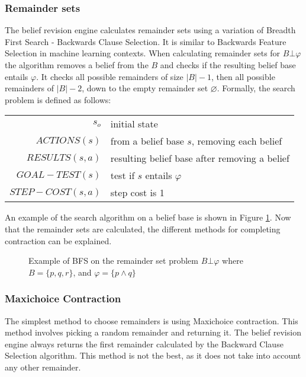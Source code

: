 \documentclass[a4paper,10pt]{article}
\newcommand{\norm}[1]{\lvert #1 \rvert}
\begin{document}
\subsubsection{Remainder sets}
\label{subsubsec:remainders}
The belief revision engine calculates remainder sets using a variation of Breadth First Search - Backwards Clause Selection. It is similar to Backwards Feature Selection in machine learning contexts. When calculating remainder sets for $B \bot\varphi$ the algorithm removes a belief from the $B$ and checks if the resulting belief base entails $\varphi$. It checks all possible remainders of size $\norm{B}-1$, then all possible remainders of $\norm{B}-2$, down to the empty remainder set $\varnothing$. Formally, the search problem is defined as follows:
\begin{table}[!htb]
\centering
\begin{tabular}{rl}
$s_o$ & initial state \\
$ACTIONS(s)$ & from a belief base $s$, removing each belief \\
$RESULTS(s, a)$ & resulting belief base after removing a belief \\
$GOAL-TEST(s)$ & test if $s$ entails $\varphi$ \\
$STEP-COST(s,a)$ & step cost is 1 \\
\end{tabular}
\end{table}

An example of the search algorithm on a belief base is shown in Figure \ref{fig:BFS}. Now that the remainder sets are calculated, the different methods for completing contraction can be explained.
\begin{figure}[!htb]
\centering
\caption{Example of BFS on the remainder set problem $B \bot\varphi$ where $B = \{p,q,r\}$, and $\varphi = \{p \wedge q\}$}
\label{fig:BFS}
\end{figure}

\subsubsection{Maxichoice Contraction}
\label{subsubsec:maxichoice}
The simplest method to choose remainders is using Maxichoice contraction. This method involves picking a random remainder and returning it. The belief revision engine always returns the first remainder calculated by the Backward Clause Selection algorithm. This method is not the best, as it does not take into account any other remainder.
\end{document}

